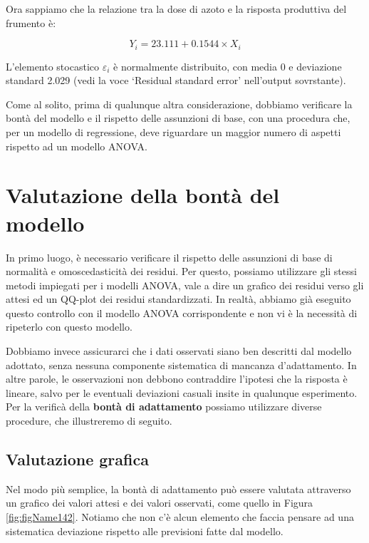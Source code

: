 \documentclass[a4paper,12pt,oneside]{book}
\begin{document}
Ora sappiamo che la relazione tra la dose di azoto e la risposta produttiva del frumento è:

\[ Y_i = 23.111 + 0.1544 \times X_i \]

L'elemento stocastico \(\varepsilon_i\) è normalmente distribuito, con media 0 e deviazione standard 2.029 (vedi la voce `Residual standard error' nell'output sovrstante).

Come al solito, prima di qualunque altra considerazione, dobbiamo verificare la bontà del modello e il rispetto delle assunzioni di base, con una procedura che, per un modello di regressione, deve riguardare un maggior numero di aspetti rispetto ad un modello ANOVA.

\hypertarget{valutazione-della-bontuxe0-del-modello}{%
\section{Valutazione della bontà del modello}\label{valutazione-della-bontuxe0-del-modello}}

In primo luogo, è necessario verificare il rispetto delle assunzioni di base di normalità e omoscedasticità dei residui. Per questo, possiamo utilizzare gli stessi metodi impiegati per i modelli ANOVA, vale a dire un grafico dei residui verso gli attesi ed un QQ-plot dei residui standardizzati. In realtà, abbiamo già eseguito questo controllo con il modello ANOVA corrispondente e non vi è la necessità di ripeterlo con questo modello.

Dobbiamo invece assicurarci che i dati osservati siano ben descritti dal modello adottato, senza nessuna componente sistematica di mancanza d'adattamento. In altre parole, le osservazioni non debbono contraddire l'ipotesi che la risposta è lineare, salvo per le eventuali deviazioni casuali insite in qualunque esperimento. Per la verificà della \textbf{bontà di adattamento} possiamo utilizzare diverse procedure, che illustreremo di seguito.

\hypertarget{valutazione-grafica}{%
\subsection{Valutazione grafica}\label{valutazione-grafica}}

Nel modo più semplice, la bontà di adattamento può essere valutata attraverso un grafico dei valori attesi e dei valori osservati, come quello in Figura \ref{fig:figName142}. Notiamo che non c'è alcun elemento che faccia pensare ad una sistematica deviazione rispetto alle previsioni fatte dal modello.
\end{document}
